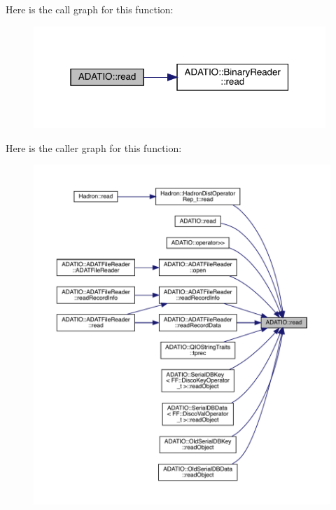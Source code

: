 Here is the call graph for this function\+:\nopagebreak
\begin{figure}[H]
\begin{center}
\leavevmode
\includegraphics[width=313pt]{d0/dba/namespaceADATIO_ab1b78a1922de3cc047517ead7aa99825_cgraph}
\end{center}
\end{figure}
Here is the caller graph for this function\+:
\nopagebreak
\begin{figure}[H]
\begin{center}
\leavevmode
\includegraphics[width=350pt]{d0/dba/namespaceADATIO_ab1b78a1922de3cc047517ead7aa99825_icgraph}
\end{center}
\end{figure}
\mbox{\label{namespaceADATIO_a32f382a05f4fc1a3d423363f7964ae1f}} 

